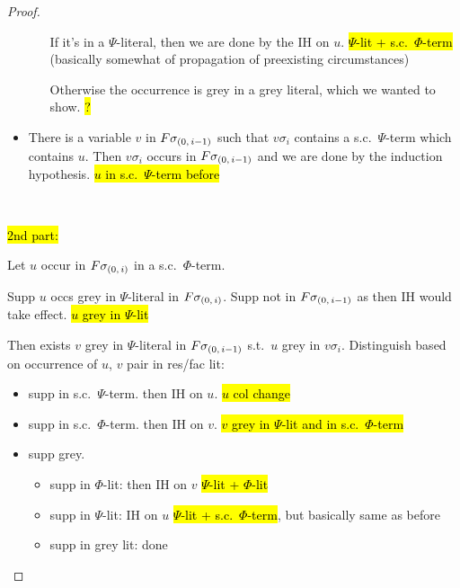 \documentclass[,%
	draft=false,%
	numbers=noendperiod
	12pt,
	a4paper,
	oneside,%
	openany,
]{memoir}
\begin{document}
\begin{proof}
\begin{itemize}
\begin{itemize}
					If it's in a $\Psi$-literal, then we are done by the IH on $u$. \hl{$\Psi$-lit + s.c.\ $\Phi$-term} (basically somewhat of propagation of preexisting circumstances)

					Otherwise the occurrence is grey in a grey literal, which we wanted to show. \hl{?}
			\end{itemize}


		\item There is a variable $v$ in $F\sigma_{(0,\,i-1)}$ such that $v\sigma_i$ contains a s.c.\ $\Psi$-term which contains $u$.
			Then $v\sigma_i$ occurs in $F\sigma_{(0,\,i-1)}$ and we are done by the induction hypothesis.
			\hl{$u$ in s.c.\ $\Psi$-term before}
	\end{itemize}


	~

	\hl{2nd part:} 

	Let $u$ occur in $F\sigma_{(0,\,i)}$ in a s.c.\ $\Phi$-term.

	Supp $u$ occs grey in $\Psi$-literal in $F\sigma_{(0,\,i)}$.
	Supp not in $F\sigma_{(0,\,i-1)}$ as then IH would take effect. \hl{$u$ grey in $\Psi$-lit}

	Then exists $v$ grey in $\Psi$-literal in $F\sigma_{(0,\,i-1)}$ s.t.\ $u$ grey in $v\sigma_i$.
	Distinguish based on occurrence of $u$, $v$ pair in res/fac lit:

	\begin{itemize}
		\item supp in s.c.\ $\Psi$-term. then IH on $u$. \hl{$u$ col change}
		\item supp in s.c.\ $\Phi$-term. then IH on $v$. \hl{$v$ grey in $\Psi$-lit and in s.c.\ $\Phi$-term}
		\item supp grey.
			\begin{itemize}
				\item supp in $\Phi$-lit: then IH on $v$ \hl{$\Psi$-lit + $\Phi$-lit}
				\item supp in $\Psi$-lit: IH on $u$ \hl{$\Psi$-lit + s.c.\ $\Phi$-term}, but basically same as before
				\item supp in grey lit: done

			\end{itemize}

	\end{itemize}





\end{proof}
\end{document}
